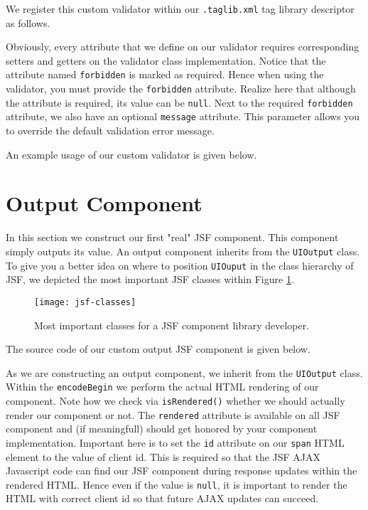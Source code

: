 We register this custom validator within our \texttt{.taglib.xml} tag library descriptor as follows.

Obviously, every attribute that we define on our validator requires corresponding setters and getters on the validator class implementation.
Notice that the attribute named \texttt{forbidden} is marked as required.
Hence when using the validator, you must provide the \texttt{forbidden} attribute.
Realize here that although the attribute is required, its value can be \texttt{null}.
Next to the required \texttt{forbidden} attribute, we also have an optional \texttt{message} attribute.
This parameter allows you to override the default validation error message.

An example usage of our custom validator is given below.


\section{Output Component}
In this section we construct our first "real" JSF component.
This component simply outputs its value.
An output component inherits from the \texttt{UIOutput} class.
To give you a better idea on where to position \texttt{UIOuput} in the class hierarchy of JSF,
we depicted the most important JSF classes within Figure \ref{fig:jsf-classes}.
\begin{figure}[htbp]
	\begin{center}
		\texttt{[image: jsf-classes]}
		\caption{Most important classes for a JSF component library developer.}
		\label{fig:jsf-classes}
	\end{center}
\end{figure}

The source code of our custom output JSF component is given below.

As we are constructing an output component, we inherit from the \texttt{UIOutput} class.
Within the \texttt{encodeBegin} we perform the actual HTML rendering of our component.
Note how we check via \texttt{isRendered()} whether we should actually render our component or not.
The \texttt{rendered} attribute is available on all JSF component and (if meaningfull) should get honored by your component implementation.
Important here is to set the \texttt{id} attribute on our \texttt{span} HTML element to the value of client id.
This is required so that the JSF AJAX Javascript code can find our JSF component during response updates within the rendered HTML.
Hence even if the value is \texttt{null}, it is important to render the HTML with correct client id so that future AJAX updates can succeed.

